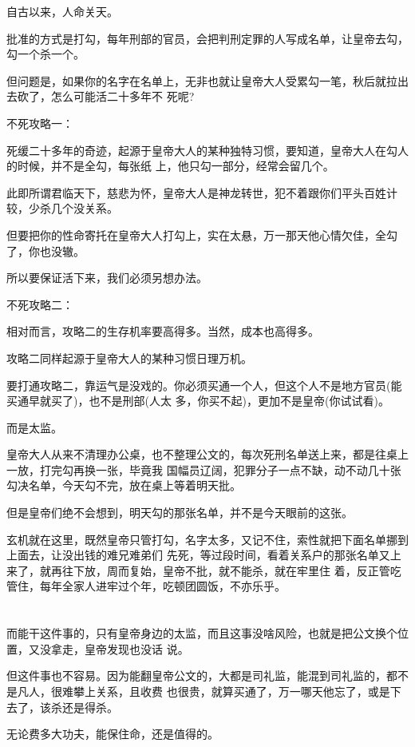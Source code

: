 \documentclass[11pt,a4paper,onecolumn]{article}
\begin{document}
自古以来，人命关天。

批准的方式是打勾，每年刑部的官员，会把判刑定罪的人写成名单，让皇帝去勾，勾一个杀一个。

但问题是，如果你的名字在名单上，无非也就让皇帝大人受累勾一笔，秋后就拉出去砍了，怎么可能活二十多年不
死呢?

不死攻略一：

死缓二十多年的奇迹，起源于皇帝大人的某种独特习惯，要知道，皇帝大人在勾人的时候，并不是全勾，每张纸
上，他只勾一部分，经常会留几个。

此即所谓君临天下，慈悲为怀，皇帝大人是神龙转世，犯不着跟你们平头百姓计较，少杀几个没关系。

但要把你的性命寄托在皇帝大人打勾上，实在太悬，万一那天他心情欠佳，全勾了，你也没辙。

所以要保证活下来，我们必须另想办法。

不死攻略二：

相对而言，攻略二的生存机率要高得多。当然，成本也高得多。

攻略二同样起源于皇帝大人的某种习惯\myrule 日理万机。

要打通攻略二，靠运气是没戏的。你必须买通一个人，但这个人不是地方官员(能买通早就买了)，也不是刑部(人太
多，你买不起)，更加不是皇帝(你试试看)。

而是太监。

皇帝大人从来不清理办公桌，也不整理公文的，每次死刑名单送上来，都是往桌上一放，打完勾再换一张，毕竟我
国幅员辽阔，犯罪分子一点不缺，动不动几十张勾决名单，今天勾不完，放在桌上等着明天批。

但是皇帝们绝不会想到，明天勾的那张名单，并不是今天眼前的这张。

玄机就在这里，既然皇帝只管打勾，名字太多，又记不住，索性就把下面名单挪到上面去，让没出钱的难兄难弟们
先死，等过段时间，看着关系户的那张名单又上来了，就再往下放，周而复始，皇帝不批，就不能杀，就在牢里住
着，反正管吃管住，每年全家人进牢过个年，吃顿团圆饭，不亦乐乎。

\section[\thesection]{}

而能干这件事的，只有皇帝身边的太监，而且这事没啥风险，也就是把公文换个位置，又没拿走，皇帝发现也没话
说。

但这件事也不容易。因为能翻皇帝公文的，大都是司礼监，能混到司礼监的，都不是凡人，很难攀上关系，且收费
也很贵，就算买通了，万一哪天他忘了，或是下去了，该杀还是得杀。

无论费多大功夫，能保住命，还是值得的。
\end{document}
